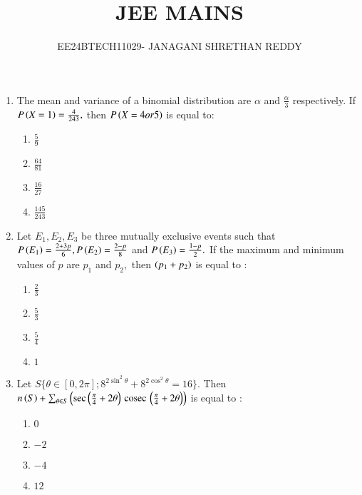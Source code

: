 \documentclass[journal,12pt,twocolumn]{IEEEtran}
\theoremstyle{remark}
\begin{document}
 


\vspace{3cm}

\title{JEE MAINS}
\author{EE24BTECH11029- JANAGANI SHRETHAN REDDY}
\maketitle{}
\newpage
\bigskip
\renewcommand{\thefigure}{\theenumi}
\renewcommand{\thetable}{\theenum}
\begin{enumerate}
    \item The mean and variance of a binomial distribution are $\alpha$ and $\frac{\alpha}{3}$ respectively. If $P\left(X=1\right)=\frac{4}{243},$ then $P\left(X=4 or 5\right)$ is equal to:
    \begin{enumerate}
        \item $\frac{5}{9}$
        \item $\frac{64}{81}$
        \item $\frac{16}{27}$
        \item $\frac{145}{243}$\\
    \end{enumerate}
    \item Let $E_1,E_2,E_3$ be three mutually exclusive events such that $P\left(E_1\right)=\frac{2+3p}{6},P\left(E_2\right)=\frac{2-p}{8}$ and $P\left(E_3\right)=\frac{1-p}{2}.$ If the maximum and minimum values of $p$ are $p_1$ and $p_2,$ then $\left(p_1+p_2\right)$ is equal to :
    \begin{enumerate}
        \item $\frac{2}{3}$
        \item $\frac{5}{3}$
        \item $\frac{5}{4}$
        \item $1$\\
    \end{enumerate}
    \item Let $S\{\theta\in[0,2\pi];8^{2\sin^2\theta}+8^{2\cos^2\theta}=16\}.$ Then $n\left(S\right)+\sum_{\theta\in S}\left(\sec\left(\frac{\pi}{4}+2\theta\right)\,\text{cosec}\,\left(\frac{\pi}{4}+2\theta\right)\right)$ is equal to :
    \begin{enumerate}
        \item $0$
        \item $-2$
        \item $-4$
        \item $12$\\
    \end{enumerate}

\end{enumerate}
\end{document}
